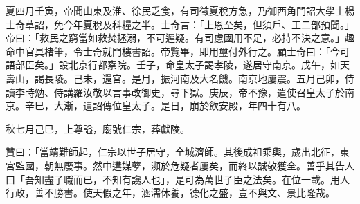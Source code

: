 \begin{pinyinscope}
夏四月壬寅，帝聞山東及淮、徐民乏食，有司徵夏稅方急，乃御西角門詔大學士楊士奇草詔，免今年夏稅及科糧之半。士奇言：「上恩至矣，但須戶、工二部預聞。」帝曰：「救民之窮當如救焚拯溺，不可遲疑。有司慮國用不足，必持不決之意。」趣命中官具楮筆，令士奇就門樓書詔。帝覽畢，即用璽付外行之。顧士奇曰：「今可語部臣矣。」設北京行都察院。壬子，命皇太子謁孝陵，遂居守南京。戊午，如天壽山，謁長陵。己未，還宮。是月，振河南及大名饑。南京地屢震。五月己卯，侍讀李時勉、侍講羅汝敬以言事改御史，尋下獄。庚辰，帝不豫，遣使召皇太子於南京。辛巳，大漸，遺詔傳位皇太子。是日，崩於飲安殿，年四十有八。

秋七月己巳，上尊謚，廟號仁宗，葬獻陵。

贊曰：「當靖難師起，仁宗以世子居守，全城濟師。其後成祖乘輿，歲出北征，東宮監國，朝無廢事。然中遘媒孽，瀕於危疑者屢矣，而終以誠敬獲全。善乎其告人曰「吾知盡子職而已，不知有讒人也」，是可為萬世子臣之法矣。在位一載。用人行政，善不勝書。使天假之年，涵濡休養，德化之盛，豈不與文、景比隆哉。


\end{pinyinscope}